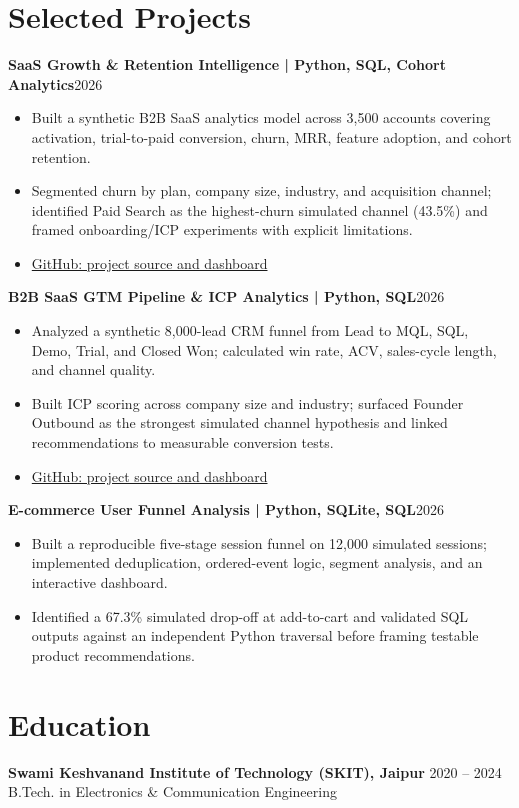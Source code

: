 \documentclass[9.8pt,a4paper]{article}
\newcommand{\role}[2]{\textbf{#1}\hfill #2\\}
\begin{document}
\section{Selected Projects}
\role{SaaS Growth \& Retention Intelligence | Python, SQL, Cohort Analytics}{2026}
\begin{itemize}
  \item Built a synthetic B2B SaaS analytics model across 3,500 accounts covering activation, trial-to-paid conversion, churn, MRR, feature adoption, and cohort retention.
  \item Segmented churn by plan, company size, industry, and acquisition channel; identified Paid Search as the highest-churn simulated channel (43.5\%) and framed onboarding/ICP experiments with explicit limitations.
  \item \href{https://github.com/ktsomani/user-funnel-analysis/tree/main/projects/saas-growth-retention}{GitHub: project source and dashboard}
\end{itemize}

\role{B2B SaaS GTM Pipeline \& ICP Analytics | Python, SQL}{2026}
\begin{itemize}
  \item Analyzed a synthetic 8,000-lead CRM funnel from Lead to MQL, SQL, Demo, Trial, and Closed Won; calculated win rate, ACV, sales-cycle length, and channel quality.
  \item Built ICP scoring across company size and industry; surfaced Founder Outbound as the strongest simulated channel hypothesis and linked recommendations to measurable conversion tests.
  \item \href{https://github.com/ktsomani/user-funnel-analysis/tree/main/projects/gtm-pipeline-icp}{GitHub: project source and dashboard}
\end{itemize}

\role{E-commerce User Funnel Analysis | Python, SQLite, SQL}{2026}
\begin{itemize}
  \item Built a reproducible five-stage session funnel on 12,000 simulated sessions; implemented deduplication, ordered-event logic, segment analysis, and an interactive dashboard.
  \item Identified a 67.3\% simulated drop-off at add-to-cart and validated SQL outputs against an independent Python traversal before framing testable product recommendations.
\end{itemize}

\section{Education}
\textbf{Swami Keshvanand Institute of Technology (SKIT), Jaipur} \hfill 2020 -- 2024\\
B.Tech. in Electronics \& Communication Engineering
\end{document}
